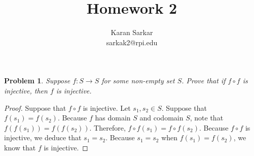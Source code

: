 \documentclass{article}
\title{Homework 2}
\author{Karan Sarkar \\ sarkak2@rpi.edu}
\newtheorem{problem}{Problem}
\begin{document}
\maketitle

\begin{problem} Suppose $f: S \rightarrow S$ for some non-empty set $S$. Prove that if $f \circ f$ is injective, then $f$ is injective. 
\end{problem}
\begin{proof}
Suppose that $f \circ f$ is injective. Let $s_1, s_2 \in S$.  Suppose that $f(s_1) = f(s_2)$. Because $f$ has domain $S$ and codomain $S$, note that $f(f(s_1)) = f(f(s_2))$. Therefore, $f \circ f(s_1) = f \circ f(s_2)$. Because $f \circ f$ is injective, we deduce that $s_1 = s_2$. Because $s_1 = s_2$ when $f(s_1) = f(s_2)$, we know that $f$ is injective.
\end{proof}
\end{document}
